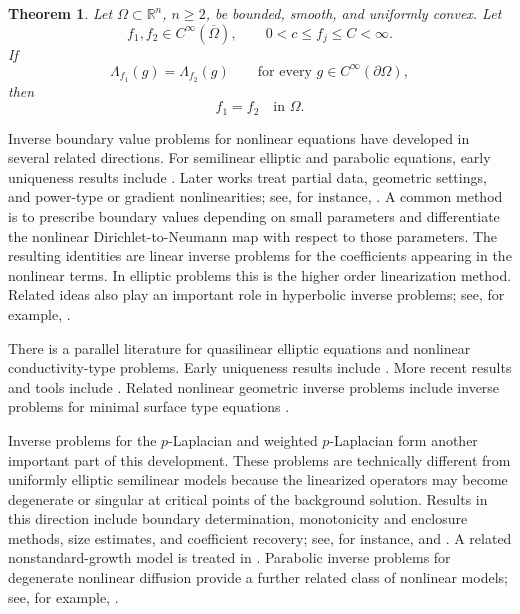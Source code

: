 \documentclass[11pt]{article}
\numberwithin{equation}{section}
\newtheorem{theorem}{Theorem}[section]
\newcommand{\R}{\mathbb R}
\newcommand{\Om}{\Omega}
\newcommand{\DN}{\Lambda}
\begin{document}
\begin{theorem}\label{thm:main}
Let \(\Om\subset\R^n\), \(n\ge2\), be bounded, smooth, and uniformly convex.  Let
\[
    f_1,f_2\in C^\infty(\overline\Om),
    \qquad
    0<c\le f_j\le C<\infty.
\]
If
\[
    \DN_{f_1}(g)=\DN_{f_2}(g)
    \qquad\text{for every }g\in C^\infty(\partial\Om),
\]
then
\[
    f_1=f_2\quad\text{in }\Om.
\]
\end{theorem}

Inverse boundary value problems for nonlinear equations have developed in several related directions.  For semilinear elliptic and parabolic equations, early uniqueness results include \cite{Isakov1993,IsakovSylvester1994,IsakovNachman1995,Sun2010}.  Later works treat partial data, geometric settings, and power-type or gradient nonlinearities; see, for instance, \cite{FeizmohammadiOksanen2020,KrupchykUhlmann2020,LassasLiimatainenLinSalo2020,LassasLiimatainenLinSalo2021}.  A common method is to prescribe boundary values depending on small parameters and differentiate the nonlinear Dirichlet-to-Neumann map with respect to those parameters.  The resulting identities are linear inverse problems for the coefficients appearing in the nonlinear terms.  In elliptic problems this is the higher order linearization method.  Related ideas also play an important role in hyperbolic inverse problems; see, for example, \cite{KurylevLassasUhlmann2018}.

There is a parallel literature for quasilinear elliptic equations and nonlinear conductivity-type problems.  Early uniqueness results include \cite{Sun1996,SunUhlmann1997,HervasSun2002,KangNakamura2002}.  More recent results and tools include \cite{EggerPietschmannSchlottbom2014,MunozUhlmann2020,Shankar2020,CarsteaFeizmohammadi2021,CarsteaFeizmohammadi2023,KianKrupchykUhlmann2023}.  Related nonlinear geometric inverse problems include inverse problems for minimal surface type equations \cite{CarsteaLassasLiimatainenOksanen2024}.

Inverse problems for the \(p\)-Laplacian and weighted \(p\)-Laplacian form another important part of this development.  These problems are technically different from uniformly elliptic semilinear models because the linearized operators may become degenerate or singular at critical points of the background solution.  Results in this direction include boundary determination, monotonicity and enclosure methods, size estimates, and coefficient recovery; see, for instance, \cite{SaloZhong2012,BranderKarSalo2015,Brander2016,GuoKarSalo2016,BranderHarrachKarSalo2018} and \cite{KarWang2017,CarsteaKar2020,CarsteaFeizmohammadi2025}.  A related nonstandard-growth model is treated in \cite{CarsteaZimmermann2025}.  Parabolic inverse problems for degenerate nonlinear diffusion provide a further related class of nonlinear models; see, for example, \cite{CarsteaGhoshUhlmann2023,CarsteaGhoshNakamura2025,CarsteaGhosh2026}.
\end{document}
